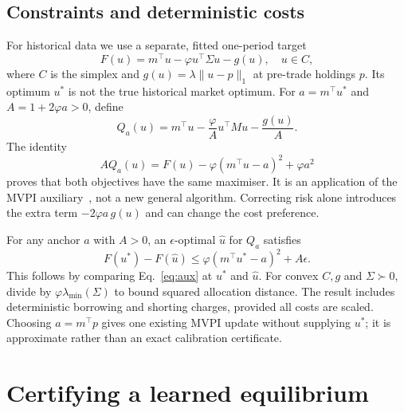 \documentclass[sigconf,anonymous,review]{acmart}
\begin{document}
\subsection{Constraints and deterministic costs}
For historical data we use a separate, fitted one-period target
\begin{equation}\label{eq:fitted}
 F(u)=m^\top u-\varphi u^\top\Sigma u-g(u),\quad u\in C,
\end{equation}
where $C $ is the simplex and $g(u)=\lambda\|u-p\|_1$ at pre-trade holdings $p $. Its optimum $u^*$ is not the true historical market optimum. For $a=m^\top u^*$ and $A=1+2\varphi a>0$, define
\begin{equation}
 Q_a(u)=m^\top u-\frac{\varphi}{A}u^\top Mu-\frac{g(u)}A.
\end{equation}
The identity
\begin{equation}\label{eq:aux}
 A Q_a(u)=F(u)-\varphi(m^\top u-a)^2+\varphi a^2
\end{equation}
proves that both objectives have the same maximiser. It is an application of the MVPI auxiliary~\cite{zhang2021}, not a new general algorithm. Correcting risk alone introduces the extra term $-2\varphi a\,g(u)$ and can change the cost preference.

For any anchor $a $ with $A>0$, an $\epsilon $-optimal $\widehat u $ for $Q_a $ satisfies
\begin{equation}\label{eq:anchor}
 F(u^*)-F(\widehat u)\le\varphi(m^\top u^*-a)^2+A\epsilon.
\end{equation}
This follows by comparing Eq.~\eqref{eq:aux} at $u^*$ and $\widehat u $. For convex $C,g $ and $\Sigma\succ0$, divide by $\varphi\lambda_{\min}(\Sigma)$ to bound squared allocation distance. The result includes deterministic borrowing and shorting charges, provided all costs are scaled. Choosing $a=m^\top p $ gives one existing MVPI update without supplying $u^*$; it is approximate rather than an exact calibration certificate.

\section{Certifying a learned equilibrium}
\end{document}
